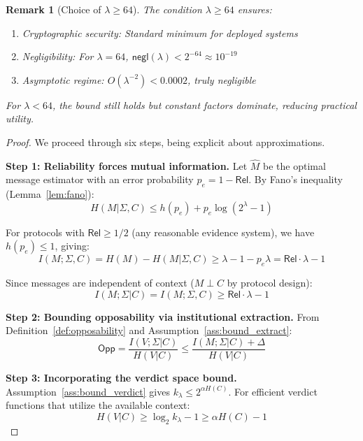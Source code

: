 \documentclass{ieeeaccess}
\newcommand{\Rel}{\mathsf{Rel}}
\newcommand{\Opp}{\mathsf{Opp}}
\newcommand{\negl}{\mathsf{negl}}
\newtheorem{remark}{Remark}[subsection]
\begin{document}
\begin{remark}[Choice of $\lambda \geq 64$]
The condition $\lambda \geq 64$ ensures:
\begin{enumerate}
    \item Cryptographic security: Standard minimum for deployed systems
    \item Negligibility: For $\lambda = 64$, $\negl(\lambda) < 2^{-64} \approx 10^{-19}$
    \item Asymptotic regime: $O(\lambda^{-2}) < 0.0002$, truly negligible
\end{enumerate}
For $\lambda < 64$, the bound still holds but constant factors dominate, reducing practical utility.
\end{remark}
\begin{proof}
We proceed through six steps, being explicit about approximations.

\textbf{Step 1: Reliability forces mutual information.} 
Let $\hat{M}$ be the optimal message estimator with an error probability $p_e = 1 - \Rel$. By Fano's inequality (Lemma~\ref{lem:fano}):
\begin{equation}
H(M|\Sigma,C) \leq h(p_e) + p_e\log(2^\lambda - 1)
\end{equation}

For protocols with $\Rel \geq 1/2$ (any reasonable evidence system), we have $h(p_e) \leq 1$, giving:
\begin{equation}\label{eq:step1}
I(M;\Sigma,C) = H(M) - H(M|\Sigma,C) \geq \lambda - 1 - p_e\lambda = \Rel \cdot \lambda - 1
\end{equation}

Since messages are independent of context ($M \perp C$ by protocol design):
\begin{equation}
I(M;\Sigma|C) = I(M;\Sigma,C) \geq \Rel \cdot \lambda - 1
\end{equation}

\textbf{Step 2: Bounding opposability via institutional extraction.} 
From Definition~\ref{def:opposability} and Assumption~\ref{ass:bound_extract}:
\begin{equation}\label{eq:step2}
\Opp = \frac{I(V;\Sigma|C)}{H(V|C)} \leq \frac{I(M;\Sigma|C) + \Delta}{H(V|C)}
\end{equation}

\textbf{Step 3: Incorporating the verdict space bound.} 
Assumption~\ref{ass:bound_verdict} gives $k_\lambda \leq 2^{\alpha H(C)}$. For efficient verdict functions that utilize the available context:
\begin{equation}
H(V|C) \geq \log_2 k_\lambda - 1 \geq \alpha H(C) - 1
\end{equation}


\end{proof}
\end{document}
